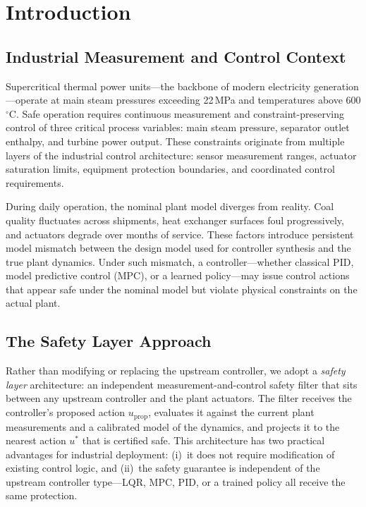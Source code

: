 \section{Introduction}

\subsection{Industrial Measurement and Control Context}

Supercritical thermal power units---the backbone of modern electricity generation---operate at main steam pressures exceeding 22\,MPa and temperatures above 600$^\circ$C. Safe operation requires continuous measurement and constraint-preserving control of three critical process variables: main steam pressure, separator outlet enthalpy, and turbine power output. These constraints originate from multiple layers of the industrial control architecture: sensor measurement ranges, actuator saturation limits, equipment protection boundaries, and coordinated control requirements.

During daily operation, the nominal plant model diverges from reality. Coal quality fluctuates across shipments, heat exchanger surfaces foul progressively, and actuators degrade over months of service. These factors introduce persistent model mismatch between the design model used for controller synthesis and the true plant dynamics. Under such mismatch, a controller---whether classical PID, model predictive control (MPC), or a learned policy---may issue control actions that appear safe under the nominal model but violate physical constraints on the actual plant.

\subsection{The Safety Layer Approach}

Rather than modifying or replacing the upstream controller, we adopt a \emph{safety layer} architecture: an independent measurement-and-control safety filter that sits between any upstream controller and the plant actuators. The filter receives the controller's proposed action $u_{\mathrm{prop}}$, evaluates it against the current plant measurements and a calibrated model of the dynamics, and projects it to the nearest action $u^*$ that is certified safe. This architecture has two practical advantages for industrial deployment: (i)~it does not require modification of existing control logic, and (ii)~the safety guarantee is independent of the upstream controller type---LQR, MPC, PID, or a trained policy all receive the same protection.

